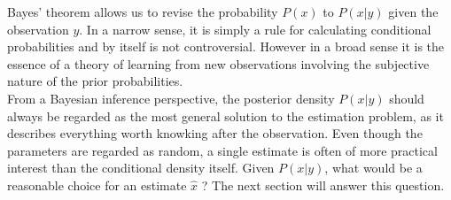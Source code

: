 \documentclass{article}
\theoremstyle{definition}
\theoremstyle{remark}
\begin{document}
Bayes' theorem allows us to revise the probability $P(x)$ to $P(x|y)$ given the observation $y$. In a narrow sense, it is simply a rule for calculating conditional probabilities and by itself is not controversial. However in a broad sense it is the essence of a theory of learning from new observations involving the subjective nature of the prior probabilities.
\\



From a Bayesian inference perspective, the posterior density $P(x|y)$ should always be regarded as the most general solution to the estimation problem, as it describes everything worth knowking after the observation. Even though the parameters are regarded as random, a single estimate is often of more practical interest than the conditional density itself. Given $P(x|y)$, what would be a reasonable choice for an estimate $\hat{x}$ ? The next section will answer this question.



\end{document}
